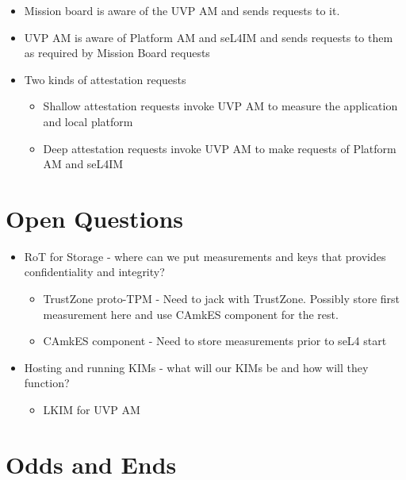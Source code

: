 \documentclass[11pt]{article}
\newcommand{\squash}{\parskip=0pt\itemsep=0pt}
\begin{document}
\begin{itemize}
  \squash
\item Mission board is aware of the UVP AM and sends requests to it.
\item UVP AM is aware of Platform AM and seL4IM and sends requests to
  them as required by Mission Board requests
\item Two kinds of attestation requests
  \begin{itemize}
  \item Shallow attestation requests invoke UVP AM to measure the
    application and local platform
  \item Deep attestation requests invoke UVP AM to make requests of
    Platform AM and seL4IM 
  \end{itemize}
\end{itemize}

\section{Open Questions}
        
\begin{itemize}
  \squash
\item RoT for Storage - where can we put measurements and keys that
  provides confidentiality and integrity?
  \begin{itemize}
    \squash
  \item TrustZone proto-TPM - Need to jack with TrustZone.  Possibly
    store first measurement here and use CAmkES component for the
    rest.
  \item CAmkES component - Need to store measurements prior to seL4 start
  \end{itemize}
\item Hosting and running KIMs - what will our KIMs be and how will they function?
  \begin{itemize}
    \squash
  \item LKIM for UVP AM
  \end{itemize}
\end{itemize}

\section{Odds and Ends}
\end{document}
